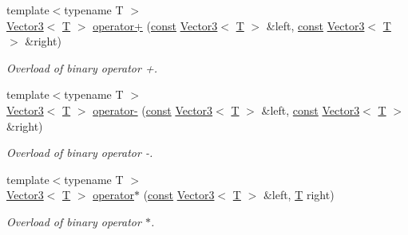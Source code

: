 \begin{DoxyCompactItemize}
{\footnotesize template$<$typename T $>$ }\\\hyperlink{classsf_1_1_vector3}{Vector3}$<$ \hyperlink{curses_8priv_8h_a5ef253115820acf7d27f3c5c3b02a0f0}{T} $>$ \hyperlink{classsf_1_1_vector3_a6500a0cb00e07801e9e9d7e96852ddd3}{operator+} (\hyperlink{term__entry_8h_a57bd63ce7f9a353488880e3de6692d5a}{const} \hyperlink{classsf_1_1_vector3}{Vector3}$<$ \hyperlink{curses_8priv_8h_a5ef253115820acf7d27f3c5c3b02a0f0}{T} $>$ \&left, \hyperlink{term__entry_8h_a57bd63ce7f9a353488880e3de6692d5a}{const} \hyperlink{classsf_1_1_vector3}{Vector3}$<$ \hyperlink{curses_8priv_8h_a5ef253115820acf7d27f3c5c3b02a0f0}{T} $>$ \&right)
\begin{DoxyCompactList}\small\item\em Overload of binary operator +. \end{DoxyCompactList}\item 
{\footnotesize template$<$typename T $>$ }\\\hyperlink{classsf_1_1_vector3}{Vector3}$<$ \hyperlink{curses_8priv_8h_a5ef253115820acf7d27f3c5c3b02a0f0}{T} $>$ \hyperlink{classsf_1_1_vector3_abe0b9411c00cf807bf8a5f835874bd2a}{operator-\/} (\hyperlink{term__entry_8h_a57bd63ce7f9a353488880e3de6692d5a}{const} \hyperlink{classsf_1_1_vector3}{Vector3}$<$ \hyperlink{curses_8priv_8h_a5ef253115820acf7d27f3c5c3b02a0f0}{T} $>$ \&left, \hyperlink{term__entry_8h_a57bd63ce7f9a353488880e3de6692d5a}{const} \hyperlink{classsf_1_1_vector3}{Vector3}$<$ \hyperlink{curses_8priv_8h_a5ef253115820acf7d27f3c5c3b02a0f0}{T} $>$ \&right)
\begin{DoxyCompactList}\small\item\em Overload of binary operator -\/. \end{DoxyCompactList}\item 
{\footnotesize template$<$typename T $>$ }\\\hyperlink{classsf_1_1_vector3}{Vector3}$<$ \hyperlink{curses_8priv_8h_a5ef253115820acf7d27f3c5c3b02a0f0}{T} $>$ \hyperlink{classsf_1_1_vector3_a44ec312b31c1a85dcff4863795f98329}{operator$\ast$} (\hyperlink{term__entry_8h_a57bd63ce7f9a353488880e3de6692d5a}{const} \hyperlink{classsf_1_1_vector3}{Vector3}$<$ \hyperlink{curses_8priv_8h_a5ef253115820acf7d27f3c5c3b02a0f0}{T} $>$ \&left, \hyperlink{curses_8priv_8h_a5ef253115820acf7d27f3c5c3b02a0f0}{T} right)
\begin{DoxyCompactList}\small\item\em Overload of binary operator $\ast$. \end{DoxyCompactList}\item 

\end{DoxyCompactItemize}
